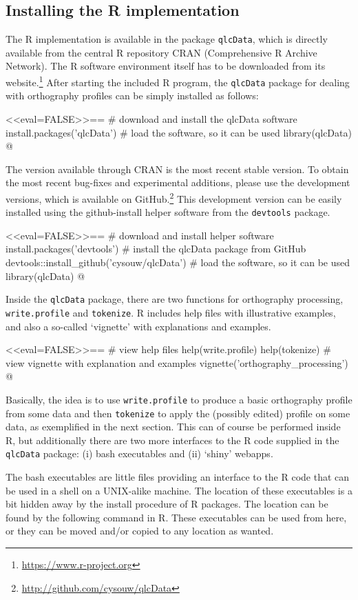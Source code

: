 \subsection*{Installing the R implementation}

The R implementation is available in the package \texttt{qlcData}, which is 
directly available from the central R repository CRAN (Comprehensive R Archive 
Network). The R software environment itself has to be downloaded from its 
website.\footnote{\url{https://www.r-project.org}} After starting the included 
R program, the \texttt{qlcData} package for dealing with orthography profiles can be 
simply installed as follows:

<<eval=FALSE>>==
# download and install the qlcData software
install.packages('qlcData') 
# load the software, so it can be used
library(qlcData) 
@

\noindent The version available through CRAN is the most recent stable version.
To obtain the most recent bug-fixes and experimental additions, please use the
development versions, which is available on
GitHub.\footnote{\url{http://github.com/cysouw/qlcData}} This development
version can be easily installed using the github-install helper software from the
\texttt{devtools} package.

<<eval=FALSE>>==
# download and install helper software
install.packages('devtools') 
# install the qlcData package from GitHub
devtools::install_github('cysouw/qlcData')
# load the software, so it can be used 
library(qlcData) 
@

\noindent Inside the \texttt{qlcData} package, there are two functions for
orthography processing, \texttt{write.profile} and \texttt{tokenize}. R includes
help files with illustrative examples, and also a so-called `vignette' with
explanations and examples.

<<eval=FALSE>>==
# view help files
help(write.profile)
help(tokenize)
# view vignette with explanation and examples
vignette('orthography_processing')
@

\noindent Basically, the idea is to use \texttt{write.profile} to produce a
basic orthography profile from some data and then \texttt{tokenize} to apply the
(possibly edited) profile on some data, as exemplified in the next section. This
can of course be performed inside R, but additionally there are two more
interfaces to the R code supplied in the \texttt{qlcData} package: (i) bash
executables and (ii) `shiny' webapps.

The bash executables are little files providing an interface to the R code that
can be used in a shell on a UNIX-alike machine. The location of these
executables is a bit hidden away by the install procedure of R packages. The
location can be found by the following command in R. These executables can be 
used from here, or they can be moved and/or copied to any location as wanted.

